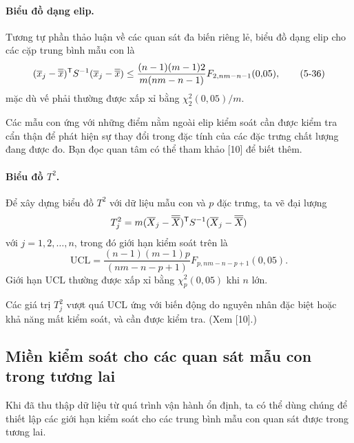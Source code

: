\paragraph{Biểu đồ dạng elip.} Tương tự phần thảo luận về các quan sát đa biến riêng lẻ, biểu đồ dạng elip cho các cặp trung bình mẫu con là
\begin{equation}
    (\overline{x}_{j}-\overline{\overline{x}})^{\mathsf T} S^{-1}(\overline{x}_{j}-\overline{\overline{x}}) \le \frac{(n-1)(m-1)2}{m(nm-n-1)}F_{2, nm-n-1}(0{,}05),
    \tag{5-36}
    \label{eq:5-36}
\end{equation}
mặc dù vế phải thường được xấp xỉ bằng $\chi_{2}^{2}(0{,}05)/m$.

Các mẫu con ứng với những điểm nằm ngoài elip kiểm soát cần được kiểm tra cẩn thận để phát hiện sự thay đổi trong đặc tính của các đặc trưng chất lượng đang được đo. Bạn đọc quan tâm có thể tham khảo [10] để biết thêm.

\paragraph{Biểu đồ $T^{2}$.} Để xây dựng biểu đồ $T^{2}$ với dữ liệu mẫu con và $p$ đặc trưng, ta vẽ đại lượng
\begin{equation*}
    T_{j}^{2} = m(\overline{X}_{j}-\overline{\overline{X}})^{\mathsf T} S^{-1}(\overline{X}_{j}-\overline{\overline{X}})
\end{equation*}
với $j=1,2,\dots,n$, trong đó giới hạn kiểm soát trên là
\begin{equation*}
    \mathrm{UCL} = \frac{(n-1)(m-1)p}{(nm-n-p+1)}F_{p, nm-n-p+1}(0{,}05).
\end{equation*}
Giới hạn $\mathrm{UCL}$ thường được xấp xỉ bằng $\chi_{p}^{2}(0{,}05)$ khi $n$ lớn.

Các giá trị $T_{j}^{2}$ vượt quá $\mathrm{UCL}$ ứng với biến động do nguyên nhân đặc biệt hoặc khả năng mất kiểm soát, và cần được kiểm tra. (Xem [10].)

\subsection*{\textbf{Miền kiểm soát cho các quan sát mẫu con trong tương lai}}

Khi đã thu thập dữ liệu từ quá trình vận hành ổn định, ta có thể dùng chúng để thiết lập các giới hạn kiểm soát cho các trung bình mẫu con quan sát được trong tương lai.


